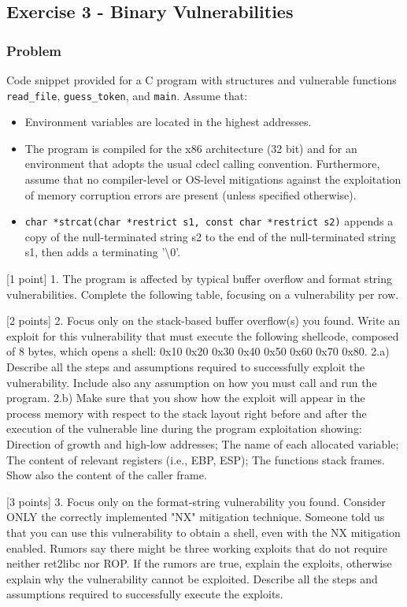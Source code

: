 \documentclass{article}
\begin{document}
\subsection{Exercise 3 - Binary Vulnerabilities}
\subsubsection*{Problem}
Code snippet provided for a C program with structures and vulnerable functions \texttt{read\_file}, \texttt{guess\_token}, and \texttt{main}.
Assume that:
\begin{itemize}
    \item Environment variables are located in the highest addresses.
    \item The program is compiled for the x86 architecture (32 bit) and for an environment that adopts the usual cdecl calling convention. Furthermore, assume that no compiler-level or OS-level mitigations against the exploitation of memory corruption errors are present (unless specified otherwise).
    \item \texttt{char *strcat(char *restrict s1, const char *restrict s2)} appends a copy of the null-terminated string s2 to the end of the null-terminated string s1, then adds a terminating '\textbackslash{}0'.

\end{itemize}
[1 point] 1. The program is affected by typical buffer overflow and format string vulnerabilities. Complete the following table, focusing on a vulnerability per row.

[2 points] 2. Focus only on the stack-based buffer overflow(s) you found. Write an exploit for this vulnerability that must execute the following shellcode, composed of 8 bytes, which opens a shell: 0x10 0x20 0x30 0x40 0x50 0x60 0x70 0x80.
2.a) Describe all the steps and assumptions required to successfully exploit the vulnerability. Include also any assumption on how you must call and run the program.
2.b) Make sure that you show how the exploit will appear in the process memory with respect to the stack layout right before and after the execution of the vulnerable line during the program exploitation showing: Direction of growth and high-low addresses; The name of each allocated variable; The content of relevant registers (i.e., EBP, ESP); The functions stack frames. Show also the content of the caller frame.

[3 points] 3. Focus only on the format-string vulnerability you found. Consider ONLY the correctly implemented "NX" mitigation technique. Someone told us that you can use this vulnerability to obtain a shell, even with the NX mitigation enabled. Rumors say there might be three working exploits that do not require neither ret2libc nor ROP. If the rumors are true, explain the exploits, otherwise explain why the vulnerability cannot be exploited. Describe all the steps and assumptions required to successfully execute the exploits.
\end{document}
